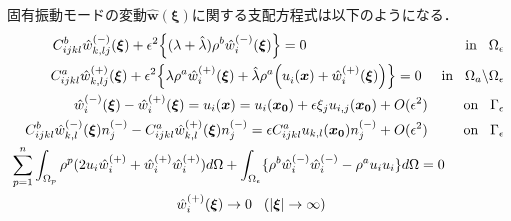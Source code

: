 固有振動モードの変動$\hat{\bm{w}}(\bm{\xi})$に関する支配方程式は以下のようになる．
\begin{align}
	C_{ijkl}^{b} \hat{w}^{(-)}_{k,lj}(\bm{\xi})
	+\epsilon^2\Bigl\{(\lambda+\hat{\lambda})\rho^{b} \hat{w}_{i}^{(-)}(\bm{\xi})\Bigr\}=0
	\hspace{4.0cm}\text{in}\hspace{0.3cm}\Omega_{\epsilon}
	\label{eq:GovDisturIn}
	\\
	C_{ijkl}^{a}\hat{w}^{(+)}_{k,lj}(\bm{\xi})
	+\epsilon^2\Bigl \{\lambda\rho^{a} \hat{w}_{i}^{(+)}(\bm{\xi})
	+\hat{\lambda}\rho^{a} \Bigl(u_{i}^{}(\bm{x})+\hat{w}_{i}^{(+)}(\bm{\xi}) \Bigr) \Bigr \}=0
	\hspace{0.5cm}\text{in}\hspace{0.3cm}\Omega_{a}\backslash\Omega_{\epsilon}
	\label{eq:GovDisturOut}
	\\
	\hat{w}_{i}^{(-)}(\bm{\xi})-\hat{w}_{i}^{(+)}(\bm{\xi})=u_{i}(\bm{x})=u_{i}(\bm{x_0})+\epsilon \xi_j u_{i,j}(\bm{x_0})+O(\epsilon^2)
	\hspace{0.9cm}\text{on}\hspace{0.3cm}\Gamma_{\epsilon}
	\label{eq:GovDisturUBC}
	\\
	C_{ijkl}^{b}\hat{w}_{k,l}^{(-)}(\bm{\xi})n_{j}^{(-)}
	-C_{ijkl}^{a}\hat{w}_{k,l}^{(+)}(\bm{\xi})n_{j}^{(-)}
	=\epsilon C_{ijkl}^{a}u_{k,l}(\bm{x_0})n_{j}^{(-)}+O(\epsilon^2)
	\hspace{0.9cm}\text{on}\hspace{0.3cm}\Gamma_{\epsilon}
	\label{eq:GovDisturSBC}
	\\
	\sum_{p=1}^{n}\int_{\Omega_p}\rho^{p}(2u_{i}\hat{w}_{i}^{(+)}+\hat{w}_{i}^{(+)}\hat{w}_{i}^{(+)}) d\Omega
	+\int_{\Omega_{\epsilon}}\{\rho^{b}\hat{w}_{i}^{(-)}\hat{w}_{i}^{(-)}-\rho^{a}u_{i}u_{i}\} d\Omega=0
	\hspace{1.5cm}
	\label{eq:GovDisturNorm}
	\\
	\hat{w}_{i}^{(+)}(\bm{\xi})\rightarrow 0 \hspace{0.3cm} (|\bm{\xi}|\rightarrow \infty)
	\hspace{4.5cm}
	\label{eq:GovDisturInftyBC}
\end{align}

